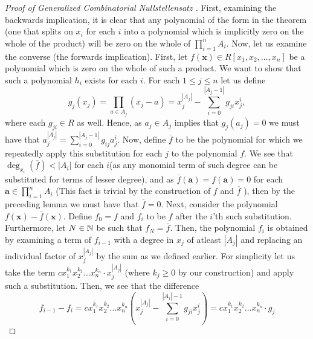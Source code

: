 	\begin{proof}[Proof of Generalized Combinatorial Nullstellensatz \cite{grynkiewicz_2013}] First, examining the backwards implication, it is
		clear that any polynomial of the form in the theorem (one that
		splits on $x_{i}$ for each $i $ into a polynomial which is
		implicitly zero on the whole of the product) will be zero on
		the whole of $\prod_{i= 1}^{n} A_i $. Now, let us examine the
		converse (the forwards implication). First, let $f\left( \textbf{x} \right) \in R[x_1,
		x_2, \ldots, x_{n}]$ be a polynomial which is zero on the whole
		of such a product. We want to show that such a polynomial
		$h_i$ exists for each $i$.  For each $1\le j \le n$ let us
		define \begin{equation} g_j \left( x_j \right) = \prod_{a \in
	A_j}^{} \left( x_j - a \right) = x_{j}^{\left| A_j \right|} -
	\sum_{i=0}^{\left| A_j -1 \right| } g_{ji} x_j ^{ i} ,\end{equation}
	where each $g_{ji} \in R$ as well. Hence, as $a_j \in A_j$ implies that
$g_j\left( a_j \right) = 0$ we must have that $a_j ^{ \left| A_j \right| } =
\sum_{i=0}^{\left| A_j -1 \right| } g_{ij} a_j ^{ i}$. Now, define
$\overline{f}$ to be the polynomial for which we repeatedly apply this
substitution for each $j$ to the polynomial $f$. We see that $\deg _{x_{i}}
\left( \overline{f} \right) < \left| A_i \right| $ for each $i$(as any monomial term of such degree can be substituted for terms of lesser degree), and as
$\overline{f}\left( \textbf{a} \right)  = f\left( \textbf{a} \right) = 0$ for
each $ \textbf{a}\in \prod_{i= 1}^{n} A_i$ (This fact is trivial by the
construction of $f$ and $\overline{f}$ ), then by the preceding lemma we must
have that $\overline{f} = 0$.  Next, consider the polynomial $f\left(
\textbf{x} \right)  - \overline{f} \left( \textbf{x} \right) $. Define $f_0 =
f$ and $f_i$ to be $f$ after the $i $'th such substitution. Furthermore, let $N \in \mathbb{N}$ be such that  $f_N =
\overline{f}$. Then, the polynomial $f_i$ is obtained by examining a term of
$f_{i-1}$ with a degree in $x_{j}$ of atleast $\left| A_j \right| $ and
replacing an individual factor of $x_{j} ^{ \left| A_j \right| }$ by the sum as
we defined earlier. For simplicity let us take the term
$cx_1^{k_1}x_2^{k_2}\ldots x_{n}^{k_n} \cdot x_{j} ^{\left| A_j \right| }$
(where $k_j \ge 0$ by our construction) and apply such a substitution. Then, we
see that the difference \[f_{i-1} - f_i = cx_1^{k_1}x_2^{k_2}\ldots x_{n}^{
k_n} \left(x_{j}^{\left| A_j \right|}  - \sum_{i=0}^{\left| A_j \right| -1}
g_{ji} x_j ^{i}\right) = cx_1^{k_1}x_2^{k_2}\ldots x_{n}^{k_n} \cdot g_j
\]
\end{proof}
